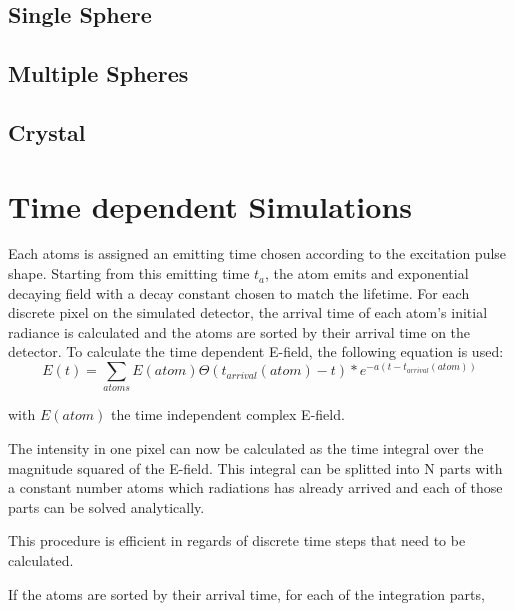 \subsection{Single Sphere}
\subsection{Multiple Spheres}
\subsection{Crystal}
\section{Time dependent Simulations}

Each atoms is assigned an emitting time  chosen according to the excitation pulse shape. Starting from this emitting time  $t_{a}$, the atom emits and exponential decaying field with a decay constant chosen to match the lifetime. 
For each discrete pixel on the simulated detector, the arrival time of each atom's initial radiance is calculated and the atoms are sorted by their arrival time on the detector. To calculate the time dependent E-field, the following equation is used:
\begin{equation}
E(t)=\sum_{atoms}  E(atom) \Theta(t_{arrival}(atom)  - t) * e^{-a(t-t_{arrival}(atom) )}
\end{equation}



with $E(atom) $ the time independent complex E-field.


The intensity in one pixel can now be calculated as the time integral over the magnitude squared of the E-field.
This integral can be splitted into N parts with a constant number atoms which radiations has already arrived and each of those parts can be solved analytically. 



This procedure is efficient in regards of discrete time steps that need to be calculated.

If the atoms are sorted by their arrival time, for each of the integration parts, 

